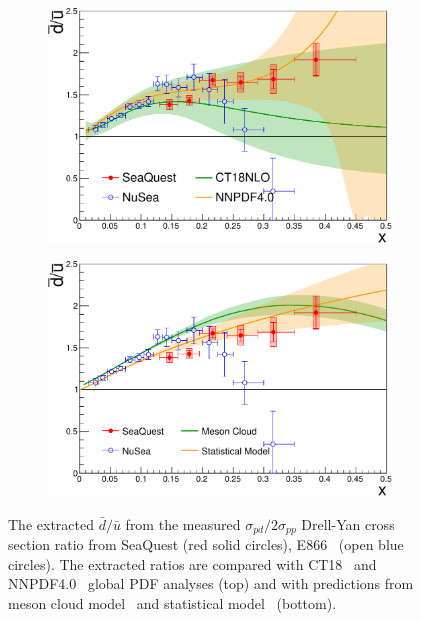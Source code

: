 \documentclass[reprint,aps,unsortedaddress,superscriptaddress,prl,floatfix,showpacs,linenumbers,final]{revtex4-2}
\begin{document}
\begin{figure}[htpb!]
	\centering
	\begin{subfigure}{\linewidth}
		\includegraphics[width=\linewidth]{E906_E866_dbarubar_PDF.pdf}
	\end{subfigure}
	\begin{subfigure}{\linewidth}
		\includegraphics[width=\linewidth]{E906_E866_dbarubar.pdf}
	\end{subfigure}
	\caption{The extracted $\bar{d}/\bar{u}$ from the measured $\sigma_{pd}/2\sigma_{pp}$ Drell-Yan cross section ratio
		from SeaQuest (red solid circles), E866~\cite{towell2001} (open blue circles).
		The extracted ratios are compared with CT18~\cite{hou2021} and NNPDF4.0~\cite{ball2022a} global PDF analyses (top)
		and with predictions from meson cloud model~\cite{alberg2022} and statistical model~\cite{soffer2019} (bottom).}
	\label{fig:e906_e866_dbarubar}
\end{figure}
\end{document}
